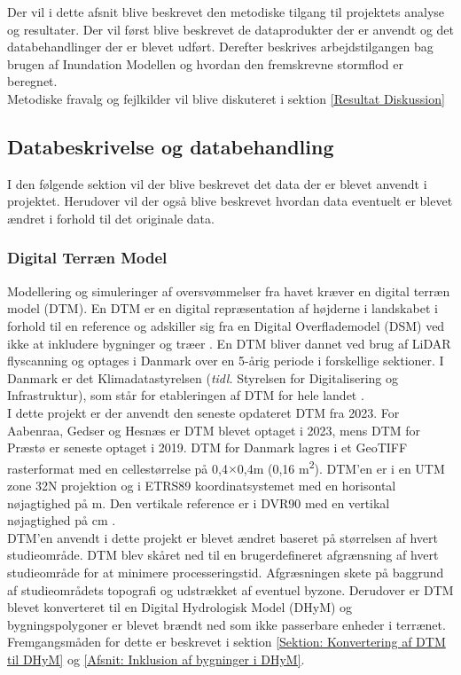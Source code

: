 Der vil i dette afsnit blive beskrevet den metodiske tilgang til projektets analyse og resultater. Der vil først blive beskrevet de dataprodukter der er anvendt og det databehandlinger der er blevet udført. Derefter beskrives arbejdstilgangen bag brugen af Inundation Modellen og hvordan den fremskrevne stormflod er beregnet. \\
Metodiske fravalg og fejlkilder vil blive diskuteret i sektion \ref{Resultat Diskussion} 

\subsection{Databeskrivelse og databehandling} \label{Sektion: Databeskrivelse}


I den følgende sektion vil der blive beskrevet det data der er blevet anvendt i projektet. Herudover vil der også blive beskrevet hvordan data eventuelt er blevet ændret i forhold til det originale data. 

\subsubsection{Digital Terræn Model} \label{Afsnit: Digital Terræn Model}
Modellering og simuleringer af oversvømmelser fra havet kræver en digital terræn model (DTM). En DTM er en digital repræsentation af højderne i landskabet i forhold til en reference og adskiller sig fra en Digital Overflademodel (DSM) ved ikke at inkludere bygninger og træer \citep{sdfe_dhm_2020}. En DTM bliver dannet ved brug af LiDAR flyscanning og optages i Danmark over en 5-årig periode i forskellige sektioner. 
I Danmark er det Klimadatastyrelsen (\textit{tidl.} Styrelsen for Digitalisering og Infrastruktur), som står for etableringen af DTM for hele landet \citep{sdfe_dhm_2020}. \\

I dette projekt er der anvendt den seneste opdateret DTM fra 2023. For Aabenraa, Gedser og Hesnæs er DTM blevet optaget i 2023, mens DTM for Præstø er seneste optaget i 2019. DTM for Danmark lagres i et GeoTIFF rasterformat med en cellestørrelse på 0,4$\times$0,4m (0,16 m\textsuperscript{2}). DTM'en er i en UTM zone 32N projektion og i ETRS89 koordinatsystemet med en horisontal nøjagtighed på  m. Den vertikale reference er i DVR90 med en vertikal nøjagtighed på  cm \citep{sdfe_dhm_2020}. \\
DTM'en anvendt i dette projekt er blevet ændret baseret på størrelsen af hvert studieområde. DTM blev skåret ned til en brugerdefineret afgrænsning af hvert studieområde for at minimere processeringstid. Afgræsningen skete på baggrund af studieområdets topografi og udstrækket af eventuel byzone. Derudover er DTM blevet konverteret til en Digital Hydrologisk Model (DHyM) og bygningspolygoner er blevet brændt ned som ikke passerbare enheder i terrænet. Fremgangsmåden for dette er beskrevet i sektion \ref{Sektion: Konvertering af DTM til DHyM} og \ref{Afsnit: Inklusion af bygninger i DHyM}.  


